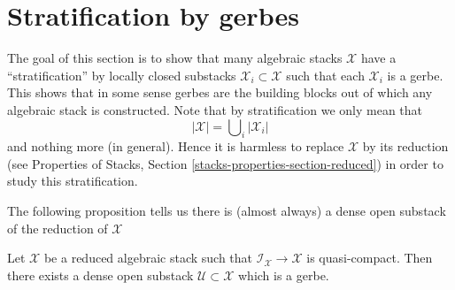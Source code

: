 \section{Stratification by gerbes}
\label{section-stratify}

\noindent
The goal of this section is to show that many algebraic stacks
$\mathcal{X}$ have a ``stratification'' by locally closed substacks
$\mathcal{X}_i \subset \mathcal{X}$ such that each $\mathcal{X}_i$ is
a gerbe. This shows that in some sense gerbes are the building blocks
out of which any algebraic stack is constructed. Note that by stratification
we only mean that
$$
|\mathcal{X}| = \bigcup\nolimits_i |\mathcal{X}_i|
$$
and nothing more (in general). Hence it is harmless to replace $\mathcal{X}$
by its reduction (see
Properties of Stacks, Section \ref{stacks-properties-section-reduced})
in order to study this stratification.

\medskip\noindent
The following proposition tells us there is (almost always) a dense
open substack of the reduction of $\mathcal{X}$

\begin{proposition}
\label{proposition-open-stratum}
Let $\mathcal{X}$ be a reduced algebraic stack such that
$\mathcal{I}_\mathcal{X} \to \mathcal{X}$ is quasi-compact.
Then there exists a dense open substack $\mathcal{U} \subset \mathcal{X}$
which is a gerbe.
\end{proposition}

